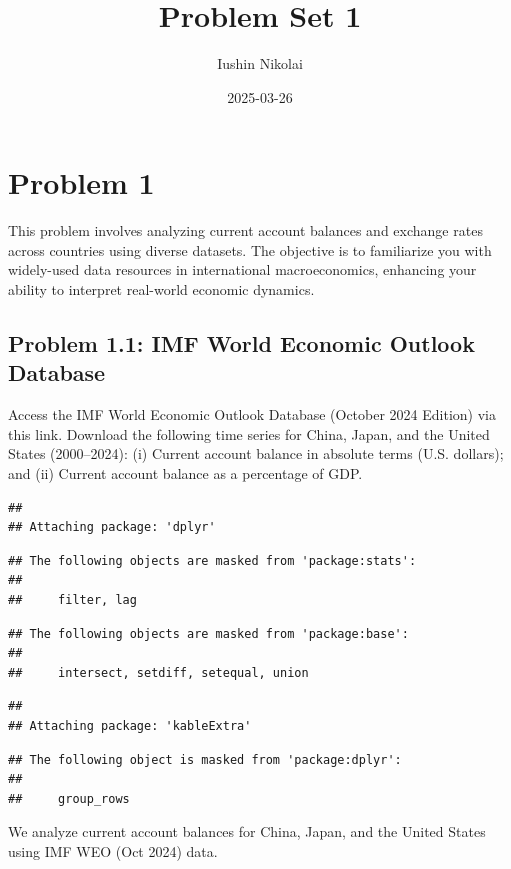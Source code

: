 \documentclass[
]{article}
\title{Problem Set 1}
\author{Iushin Nikolai}
\date{2025-03-26}
\begin{document}
\maketitle

{
\setcounter{tocdepth}{2}
\tableofcontents
}
\section{Problem 1}\label{problem-1}

This problem involves analyzing current account balances and exchange
rates across countries using diverse datasets. The objective is to
familiarize you with widely-used data resources in international
macroeconomics, enhancing your ability to interpret real-world economic
dynamics.

\subsection{Problem 1.1: IMF World Economic Outlook
Database}\label{problem-1.1-imf-world-economic-outlook-database}

Access the IMF World Economic Outlook Database (October 2024 Edition)
via this link. Download the following time series for China, Japan, and
the United States (2000--2024): (i) Current account balance in absolute
terms (U.S. dollars); and (ii) Current account balance as a percentage
of GDP.

\begin{verbatim}
## 
## Attaching package: 'dplyr'
\end{verbatim}

\begin{verbatim}
## The following objects are masked from 'package:stats':
## 
##     filter, lag
\end{verbatim}

\begin{verbatim}
## The following objects are masked from 'package:base':
## 
##     intersect, setdiff, setequal, union
\end{verbatim}

\begin{verbatim}
## 
## Attaching package: 'kableExtra'
\end{verbatim}

\begin{verbatim}
## The following object is masked from 'package:dplyr':
## 
##     group_rows
\end{verbatim}

We analyze current account balances for China, Japan, and the United
States using IMF WEO (Oct 2024) data.
\end{document}

